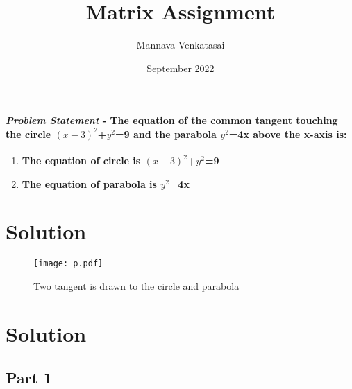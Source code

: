 \documentclass[journal,10pt,twocolumn]{article}
\title{\textbf{Matrix Assignment}}
\author{Mannava Venkatasai}
\date{September 2022}
\begin{document}
\maketitle
\paragraph{\textit{Problem Statement} - The equation of the common tangent touching the circle $(x-3)^2$+$y^2$=9 and the parabola $y^2$=4x above the x-axis is: }
\begin{enumerate}
\item \textbf{The equation of circle is $(x-3)^2$+$y^2$=9}
\item \textbf{The equation of parabola is $y^2$=4x} 
\end{enumerate}
\section*{Solution}
\begin{figure}[h]
\centering
\texttt{[image: p.pdf]}
\caption{Two tangent is drawn to the circle and parabola}
\label{fig:Curve}
\end{figure}
\section*{Solution}
\subsection*{Part 1}
\end{document}
